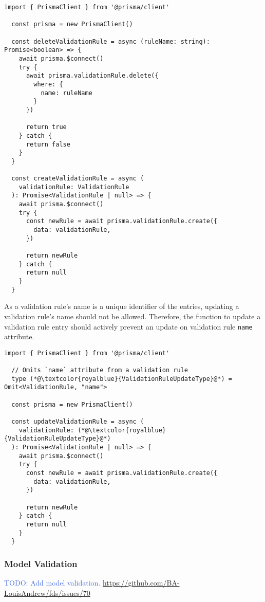   \begin{lstlisting}[style=es6, caption={Creating a new validation rule and deleting an existing entry based on its name (TypeScript)}]
  import { PrismaClient } from '@prisma/client'

  const prisma = new PrismaClient()

  const deleteValidationRule = async (ruleName: string): Promise<boolean> => {
    await prisma.$connect()
    try {
      await prisma.validationRule.delete({
        where: {
          name: ruleName
        }
      })

      return true
    } catch {
      return false
    }
  }
  
  const createValidationRule = async (
    validationRule: ValidationRule
  ): Promise<ValidationRule | null> => {
    await prisma.$connect()
    try {
      const newRule = await prisma.validationRule.create({
        data: validationRule,
      })
  
      return newRule
    } catch {
      return null
    }
  }
  \end{lstlisting}  

  As a validation rule's name is a unique identifier of the entries, updating a validation rule's name should not be allowed. Therefore, the function to update a validation rule entry should actively prevent an update on validation rule \verb;name; attribute. 

  \begin{lstlisting}[style=es6, caption={Getting an existing validation rule based on its name in the database (TypeScript)}]
  import { PrismaClient } from '@prisma/client'

  // Omits `name` attribute from a validation rule
  type (*@\textcolor{royalblue}{ValidationRuleUpdateType}@*) = Omit<ValidationRule, "name"> 

  const prisma = new PrismaClient()
  
  const updateValidationRule = async (
    validationRule: (*@\textcolor{royalblue}{ValidationRuleUpdateType}@*)
  ): Promise<ValidationRule | null> => {
    await prisma.$connect()
    try {
      const newRule = await prisma.validationRule.create({
        data: validationRule,
      })
  
      return newRule
    } catch {
      return null
    }
  }
  \end{lstlisting}  

    \subsubsection{Model Validation}
      \textcolor{royalblue}{TODO: Add model validation. \url{https://github.com/BA-LouisAndrew/fds/issues/70}}

